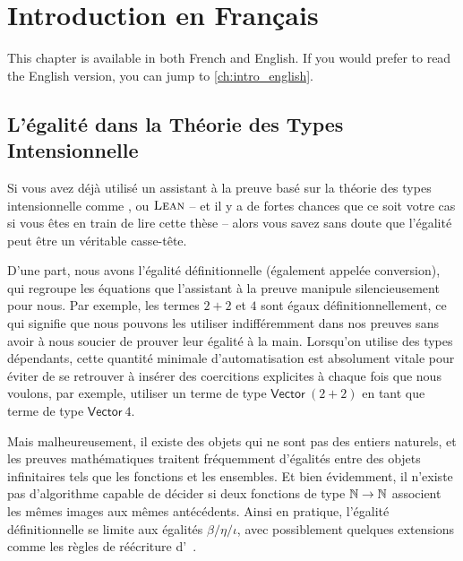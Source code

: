\setchapterpreamble[u]{\margintoc}
\chapter{Introduction en Français}

\begin{kaobox}
  This chapter is available in both French and English. If you would prefer
  to read the English version, you can jump to \cref{ch:intro_english}.
\end{kaobox}

\section{L'égalité dans la Théorie des Types Intensionnelle}

Si vous avez déjà utilisé un assistant à la preuve basé sur la théorie des types 
intensionnelle comme \Coq, \Agda ou \( {\textsc{Lean}} \) -- et il y a de fortes chances que 
ce soit votre cas si vous êtes en train de lire cette thèse -- alors vous savez 
sans doute que l'égalité peut être un véritable casse-tête.

D'une part, nous avons l'égalité définitionnelle (également appelée conversion), 
qui regroupe les équations que l'assistant à la preuve manipule silencieusement 
pour nous. 
% 
% 
Par exemple, les termes \( 2 + 2 \) et \( 4 \) sont égaux définitionnellement, 
ce qui signifie que nous pouvons les utiliser indifféremment dans nos preuves 
sans avoir à nous soucier de prouver leur égalité à la main. 
% 
Lorsqu'on utilise des types dépendants, cette quantité minimale 
d'automatisation est absolument vitale pour éviter de se retrouver à insérer 
des coercitions explicites à chaque fois que nous voulons, par exemple, 
utiliser un terme de type \( \mathsf{Vector}\ (2+2) \) en tant que terme de 
type \( \mathsf{Vector}\ 4 \).

Mais malheureusement, il existe des objets qui ne sont pas des entiers 
naturels, et les preuves mathématiques traitent 
fréquemment d'égalités entre des objets infinitaires tels que les fonctions et les 
ensembles. 
% 
Et bien évidemment, il n'existe pas d'algorithme capable de décider si deux 
fonctions de type \( \mathbb{N} \to \mathbb{N} \) associent les mêmes images aux mêmes 
antécédents.
% 
Ainsi en pratique, l'égalité définitionnelle se limite aux égalités 
\( \beta / \eta / \iota \), avec possiblement quelques extensions comme les 
règles de réécriture d'\Agda~.

